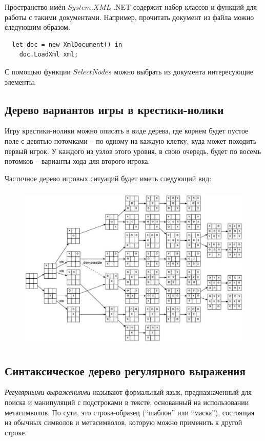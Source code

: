 \documentclass[a4paper,11pt]{article}
\begin{document}
Пространство имён $System.XML$ .NET содержит набор классов и функций для работы
с такими документами. Например, прочитать документ из файла можно следующим 
образом:
\begin{lstlisting}
  let doc = new XmlDocument() in
    doc.LoadXml xml;
\end{lstlisting}
С помощью функции $SelectNodes$ можно выбрать из документа интересующие
элементы.

\subsection{Дерево вариантов игры в крестики-нолики}
Игру крестики-нолики можно описать в виде дерева, где корнем будет пустое
поле с девятью потомками -- по одному на каждую клетку, куда может походить
первый игрок. У каждого из узлов этого уровня, в свою очередь, будет по
восемь потомков -- варианты хода для второго игрока.

Частичное дерево игровых ситуаций будет иметь следующий вид:
\begin{figure}[H]
  \begin{center}
    \includegraphics[height=80mm]{lab1/tictactoe.eps}
  \end{center}
\end{figure}

\subsection{Синтаксическое дерево регулярного выражения}
\emph{Регулярными выражениями} называют формальный язык, предназначенный для 
поиска и манипуляций с подстроками в тексте, основанный на использовании 
метасимволов. По сути, это строка-образец (``шаблон'' или ``маска''),
состоящая из обычных символов и метасимволов, которую можно применить к
другой строке.
\end{document}
